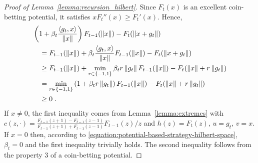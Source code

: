 \begin{proof}[Proof of Lemma~\ref{lemma:recursion_hilbert}]
Since $F_t(x)$ is an excellent coin-betting potential, it satisfies $x
F_t''(x) \ge F_t'(x)$. Hence,
\begin{align*}
&\left(1 + \beta_t \frac{\langle g_t, x \rangle}{\left\|{x}\right\|} \right) F_{t-1}(\left\|{x}\right\|) - F_t(\left\|{x + g_t}\right\|) \\
&\quad = F_{t-1}(\left\|{x}\right\|) + \beta_t \frac{\langle g_t, x \rangle}{\left\|{x}\right\|} F_{t-1}(\left\|{x}\right\|) - F_t(\left\|{x + g_t}\right\|) \\
&\quad \ge F_{t-1}(\left\|{x}\right\|)+\min_{r \in \{-1,1\}} \beta_t r \left\|{g_t}\right\| F_{t-1}(\left\|{x}\right\|) - F_t(\left\|{x}\right\| + r \left\|{g_t}\right\|) \\
&\quad =\min_{r \in \{-1,1\}} \left(1 + \beta_t r \left\|{g_t}\right\|\right) F_{t-1}(\left\|{x}\right\|) - F_t(\left\|{x}\right\| + r \left\|{g_t}\right\|) \\
&\quad \ge 0 \; .
\end{align*}
If $x \neq 0$, the first inequality comes from Lemma~\ref{lemma:extremes} with
$c(z,\cdot) = \frac{F_{t-1}(z+1) - F_{t-1}(z-1)}{F_{t-1}(z+1) + F_{t-1}(z-1)} F_{t-1}(z) / z$ and
$h(z) = F_t(z)$, $u=g_t$, $v=x$.
If $x=0$ then, according to
\eqref{equation:potential-based-strategy-hilbert-space}, $\beta_t = 0$ and the
first inequality trivially holds. The second inequality follows from the
property 3 of a coin-betting potential.
\end{proof}
